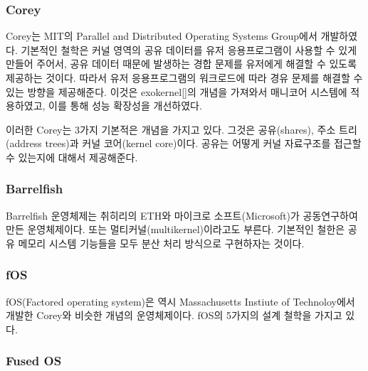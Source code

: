 \subsubsection{Corey}

Corey는 MIT의 Parallel and Distributed Operating Systems Group에서 개발하였다. 
기본적인 철학은 커널 영역의 공유 데이터를 유저 응용프로그램이 사용할 수 있게 만들어 주어서, 
공유 데이터 때문에 발생하는 경합 문제를 유저에게 해결할 수 있도록 제공하는 것이다. 
따라서 유저 응용프로그램의 워크로드에 따라 경유 문제를 해결할 수 있는 방향을 제공해준다.
이것은 exokernel[]의 개념을 가져와서 매니코어 시스템에 적용하였고, 이를 통해 성능 확장성을 개선하였다.

이러한 Corey는 3가지 기본적은 개념을 가지고 있다. 그것은 공유(shares), 주소 트리(address trees)과 커널
코어(kernel core)이다.
공유는 어떻게 커널 자료구조를 접근할 수 있는지에 대해서 제공해준다.



\subsubsection{Barrelfish}

Barrelfish 운영체제는 취히리의 ETH와 마이크로 소프트(Microsoft)가 공동연구하여 만든 운영체제이다. 
또는 멀티커널(multikernel)이라고도 부른다.
기본적인 철한은 공유 메모리 시스템 기능들을 모두 분산 처리 방식으로 구현하자는 것이다.


\subsubsection{fOS}

fOS(Factored operating system)은 역시 Massachusetts Instiute of Technoloy에서 개발한
Corey와 비슷한 개념의 운영체제이다. 
fOS의 5가지의 설계 철학을 가지고 있다. 

\subsubsection{Fused OS}

